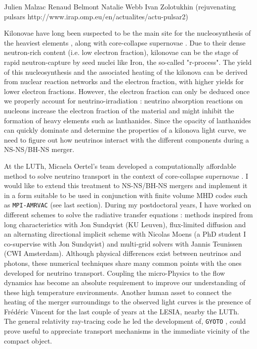\documentclass[12pt,onecolumn]{article}
\makeatletter
\newcommand*{\ns}{NS\@\xspace}
\newcommand*{\bh}{BH\@\xspace}
\newcommand*{\ie}{i.e.\@\xspace}
\makeatother
\begin{document}
Julien Malzac
Renaud Belmont
Natalie Webb
Ivan Zolotukhin (rejuvenating pulsars http://www.irap.omp.eu/en/actualites/actu-pulsar2)

Kilonovae have long been suspected to be the main site for the nucleosynthesis of the heaviest elements \citep{Lattimer1974}, along with core-collapse supernovae \citep{MacFadyen1999}. Due to their dense neutron-rich content (\ie low electron fraction), kilonovae can be the stage of rapid neutron-capture by seed nuclei like Iron, the so-called "r-process". The yield of this nucleosynthesis and the associated heating of the kilonova can be derived from nuclear reaction networks \citep{Metzger2010} and the electron fraction, with higher yields for lower electron fractions. However, the electron fraction can only be deduced once we properly account for neutrino-irradiation : neutrino absorption reactions on nucleons increase the electron fraction of the material and might inhibit the formation of heavy elements such as lanthanides. Since the opacity of lanthanides can quickly dominate and determine the properties of a kilonova light curve, we need to figure out how neutrinos interact with the different components during a \ns-\ns/\bh-\ns merger.

At the LUTh, Micaela Oertel's team developed a computationally affordable method to solve neutrino transport in the context of core-collapse supernovae \citep{Peres2011,Peres2013}. I would like to extend this treatment to \ns-\ns/\bh-\ns mergers and implement it in a form suitable to be used in conjunction with finite volume MHD codes such as \texttt{MPI-AMRVAC} (see last section). During my postdoctoral years, I have worked on different schemes to solve the radiative transfer equations : methods inspired from long characteristics with Jon Sundqvist (KU Leuven), flux-limited diffusion and an alternating directional implicit scheme with Nicolas Moens (a PhD student I co-supervise with Jon Sundqvist) and multi-grid solvers with Jannis Teunissen (CWI Amsterdam). Although physical differences exist between neutrinos and photons, these numerical techniques share many common points with the ones developed for neutrino transport. Coupling the micro-Physics to the flow dynamics has become an absolute requirement to improve our understanding of these high temperature environments. Another human asset to connect the heating of the merger surroundings to the observed light curves is the presence of Fr\'{e}d\'{e}ric Vincent for the last couple of years at the LESIA, nearby the LUTh. The general relativity ray-tracing code he led the development of, \texttt{GYOTO} \citep{Vincent2011}, could prove useful to appreciate transport mechanisms in the immediate vicinity of the compact object.
\end{document}
